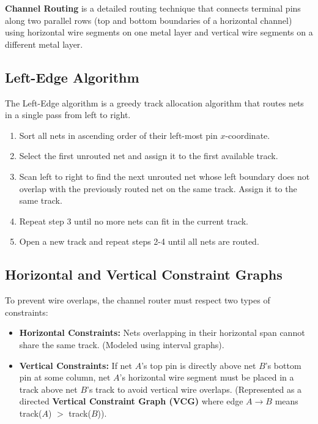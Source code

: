 \documentclass[12pt,a4paper]{article}
\begin{document}
\begin{tcolorbox}[defbox, title={Channel Routing}]
  \textbf{Channel Routing} is a detailed routing technique that connects terminal pins along two parallel rows (top and bottom boundaries of a horizontal channel) using horizontal wire segments on one metal layer and vertical wire segments on a different metal layer.
\end{tcolorbox}

\subsection{Left-Edge Algorithm}
The Left-Edge algorithm is a greedy track allocation algorithm that routes nets in a single pass from left to right.
\begin{enumerate}[leftmargin=*, itemsep=2pt]
  \item Sort all nets in ascending order of their left-most pin $x$-coordinate.
  \item Select the first unrouted net and assign it to the first available track.
  \item Scan left to right to find the next unrouted net whose left boundary does not overlap with the previously routed net on the same track. Assign it to the same track.
  \item Repeat step 3 until no more nets can fit in the current track.
  \item Open a new track and repeat steps 2-4 until all nets are routed.
\end{enumerate}

\subsection{Horizontal and Vertical Constraint Graphs}
To prevent wire overlaps, the channel router must respect two types of constraints:
\begin{itemize}[leftmargin=*, itemsep=2pt]
  \item \textbf{Horizontal Constraints:} Nets overlapping in their horizontal span cannot share the same track. (Modeled using interval graphs).
  \item \textbf{Vertical Constraints:} If net $A$'s top pin is directly above net $B$'s bottom pin at some column, net $A$'s horizontal wire segment must be placed in a track above net $B$'s track to avoid vertical wire overlaps. (Represented as a directed \textbf{Vertical Constraint Graph (VCG)} where edge $A \rightarrow B$ means track($A$) $>$ track($B$)).
\end{itemize}
\end{document}
